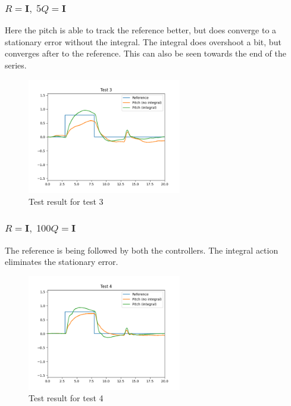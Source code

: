 \subsubsection{$R = \mathbf{I},\; 5Q=\mathbf{I}$}
Here the pitch is able to track the reference better, but does converge to a stationary error without the integral. The integral does overshoot a bit, but converges after to the reference. This can also be seen towards the end of the series. 
\begin{figure}[H]
	\centering
	\includegraphics[width=0.6\textwidth]{figures/lab2-test3.png}
	\caption{Test result for test 3}
	\label{}
\end{figure}

\subsubsection{$R = \mathbf{I},\; 100Q=\mathbf{I}$}
The reference is being followed by both the controllers. The integral action eliminates the stationary error.
\begin{figure}[H]
	\centering
	\includegraphics[width=0.6\textwidth]{figures/lab2-test4.png}
	\caption{Test result for test 4}
	\label{}
\end{figure}

